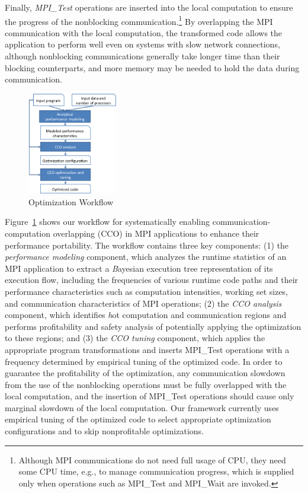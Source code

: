 Finally, \emph{MPI\_Test} operations are inserted into the local computation to
ensure the progress of the nonblocking
communication.\footnote{Although MPI communications do not need full
  usage of CPU, they need some CPU time, e.g., to manage communication
  progress, which is supplied only when operations such as MPI\_Test
  and MPI\_Wait are invoked.}  By overlapping the MPI communication
with the local computation, the transformed code allows the
application to perform well even on systems with slow network
connections, although nonblocking communications generally take longer
time than their blocking counterparts, and more memory may be needed to
hold the data during communication.

\begin{figure}[h]
\centering
\includegraphics[width=0.35\textwidth]{fig/framework.png} %
\caption{Optimization Workflow}
\label{fig:overview}
\end{figure}

Figure~\ref{fig:overview} shows our workflow for systematically
enabling communication-computation overlapping (CCO) in MPI
applications to enhance their performance portability.  The
workflow contains three key components: (1) the \emph{performance
  modeling} component, which analyzes the runtime statistics of an MPI
application to extract a {\emph Bayesian execution
  tree\cite{jichi:ipdps14}} representation of its execution flow,
including the frequencies of various runtime code paths and their
performance characteristics such as computation intensities, working
set sizes, and communication characteristics of MPI operations; (2)
the \emph{CCO analysis} component, which identifies {\emph hot}
computation and communication regions  
and performs profitability and safety
analysis of potentially applying the optimization to these regions; and (3) the \emph{CCO
  tuning} component, which applies the appropriate program
transformations 
and inserts MPI\_Test operations with a frequency
determined by empirical tuning of the optimized code.  
In order to guarantee the profitability of the optimization, any
communication slowdown from the use of the nonblocking operations must
be fully overlapped with the local computation, and the insertion of
MPI\_Test operations should cause only marginal slowdown of the local
computation.
Our framework currently
uses empirical tuning of the optimized code to select appropriate
optimization configurations and to skip nonprofitable optimizations.


